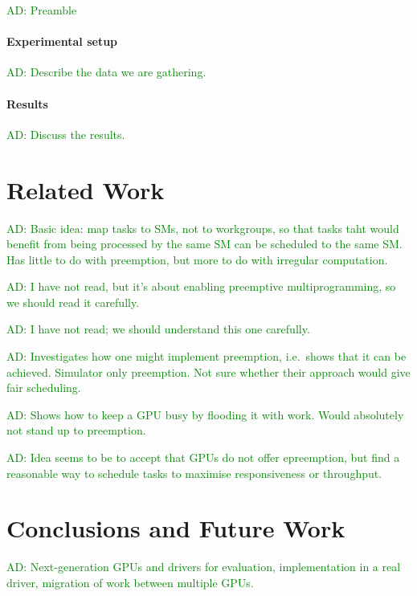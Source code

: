 \documentclass[numbers,nocopyrightspace,10pt]{sigplanconf}
\newcommand{\ADComment}[1]{\textcolor{green}{AD: #1}}
\begin{document}
\ADComment{Preamble}

\paragraph{Experimental setup}  \ADComment{Describe the data we are gathering.}

\paragraph{Results}  \ADComment{Discuss the results.}



\section{Related Work}\label{sec:relatedwork}


\cite{DBLP:conf/ics/WuCLSV15} \ADComment{Basic idea: map tasks to
  SMs, not to workgroups, so that tasks taht would benefit from being
  processed by the same SM can be scheduled to the same SM.  Has
  little to do with preemption, but more to do with irregular
  computation.}

\cite{DBLP:conf/isca/TanasicGCRNV14} \ADComment{I have not read, but
  it's about enabling preemptive multiprogramming, so we should read
  it carefully.}

\cite{DBLP:conf/ppopp/Muyan-OzcelikO16} \ADComment{I have not read; we
  should understand this one carefully.}

\cite{DBLP:conf/asplos/ParkPM15} \ADComment{Investigates how one might
  implement preemption, i.e.\ shows that it can be achieved.
  Simulator only preemption.  Not sure whether their approach would
  give fair scheduling.}

\cite{DBLP:journals/tog/SteinbergerKBKDS14} \ADComment{Shows how to
  keep a GPU busy by flooding it with work.  Would absolutely not
  stand up to preemption.}

\cite{DBLP:conf/usenix/KatoLRI11} \ADComment{Idea seems to be to
  accept that GPUs do not offer epreemption, but find a reasonable way
  to schedule tasks to maximise responsiveness or throughput.}


\section{Conclusions and Future Work}\label{sec:conclusion}

\ADComment{Next-generation GPUs and drivers for evaluation,
  implementation in a real driver, migration of work between multiple
  GPUs.}
\end{document}
